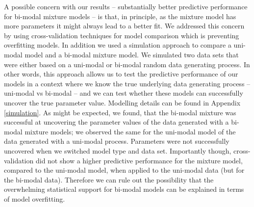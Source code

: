 \documentclass[
  english,
  man,floatsintext]{apa7}
\begin{document}
A possible concern with our results -- substantially better predictive performance for bi-modal mixture models -- is that, in principle, as the mixture model has more parameters it might always lead to a better fit. We addressed this concern by using cross-validation techniques for model comparison which is preventing overfitting models. In addition we used a simulation approach to compare a uni-modal model and a bi-modal mixture model. We simulated two data sets that were either based on a uni-modal or bi-modal random data generating process. In other words, this approach allows us to test the predictive performance of our models in a context where we know the true underlying data generating process -- uni-modal vs bi-modal -- and we can test whether these models can successfully uncover the true parameter value. Modelling details can be found in Appendix \ref{simulation}. As might be expected, we found, that the bi-modal mixture was successful at uncovering the parameter values of the data generated with a bi-modal mixture models; we observed the same for the uni-modal model of the data generated with a uni-modal process. Parameters were not successfully uncovered when we switched model type and data set. Importantly though, cross-validation did not show a higher predictive performance for the mixture model, compared to the uni-modal model, when applied to the uni-modal data (but for the bi-modal data). Therefore we can rule out the possibility that the overwhelming statistical support for bi-modal models can be explained in terms of model overfitting.
\end{document}
